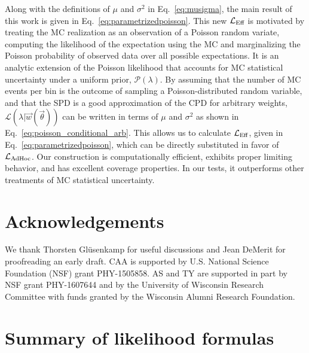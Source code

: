 \documentclass[a4paper, 11pt]{article}
\newcommand{\like}{\mathcal{L}}
\newcommand{\vectheta}{\vec{\theta}}
\newcommand{\vecw}{\vec{w}}
\newcommand{\prob}{\mathcal{P}}
\newcommand{\mcl}{\like_\textmd{Eff}}
\newcommand{\adhoc}{\mathcal{L}_{\textmd{AdHoc}}}
\begin{document}
Along with the definitions of $\mu$ and $\sigma^2$ in Eq.~\eqref{eq:musigma}, the main result of this work is given in Eq.~\eqref{eq:parametrizedpoisson}. This new $\mcl$ is motivated by treating the MC realization as an observation of a Poisson random variate, computing the likelihood of the expectation using the MC and marginalizing the Poisson probability of observed data over all possible expectations. It is an analytic extension of the Poisson likelihood that accounts for MC statistical uncertainty under a uniform prior, $\prob(\lambda)$. By assuming that the number of MC events per bin is the outcome of sampling a Poisson-distributed random variable, and that the SPD is a good approximation of the CPD for arbitrary weights, $\like \left(\lambda|\vecw(\vectheta)\right)$ can be written in terms of $\mu$ and $\sigma^2$ as shown in Eq.~\eqref{eq:poisson_conditional_arb}. This allows us to calculate $\mcl$, given in Eq.~\eqref{eq:parametrizedpoisson}, which can be directly substituted in favor of $\adhoc$. Our construction is computationally efficient, exhibits proper limiting behavior, and has excellent coverage properties. In our tests, it outperforms other treatments of MC statistical uncertainty.

\section*{Acknowledgements} \label{sec:ack}

We thank Thorsten Gl\"usenkamp for useful discussions and Jean DeMerit for proofreading an early draft. CAA is supported by U.S. National Science Foundation (NSF) grant PHY-1505858. AS and TY are supported in part by NSF grant PHY-1607644 and by the University of Wisconsin Research Committee with funds granted by the Wisconsin Alumni Research Foundation.




\newpage

\appendix

\ifx \standalonesupplemental\undefined
\setcounter{page}{1}
\setcounter{figure}{0}
\setcounter{table}{0}
\setcounter{equation}{0}
\fi

\renewcommand{\thepage}{Supplementary Methods and Tables -- S\arabic{page}}
\renewcommand{\figurename}{SUPPL. FIG.}
\renewcommand{\tablename}{SUPPL. TABLE}
\renewcommand{\arraystretch}{2}

\renewcommand{\theequation}{A\arabic{equation}}

\section{Summary of likelihood formulas\label{sec:appendixA}}
\end{document}
